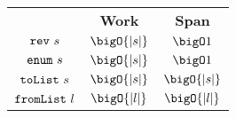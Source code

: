 \begin{costspec}[Miscellaneous]
\begin{tabular}{c|c|c}
& \textbf{Work} & \textbf{Span} \\
%
$\texttt{rev}~s$ &
$\displaystyle \bigO{|s|}$ &
$\displaystyle \bigO 1$ \\
%
$\texttt{enum}~s$ &
$\displaystyle \bigO{|s|}$ &
$\displaystyle \bigO 1$ \\
%
$\texttt{toList}~s$ &
$\bigO{|s|}$ &
$\bigO{|s|}$ \\
%
$\texttt{fromList}~l$ &
$\bigO{|l|}$ &
$\bigO{|l|}$ \\
%
\end{tabular}
\end{costspec}

